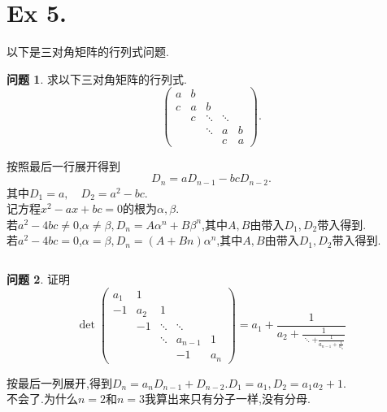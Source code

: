 \documentclass[11pt]{ctexart}
\theoremstyle{definition}
\newtheorem{qqq}{问题}[section]
\numberwithin{equation}{section}
\begin{document}
\section{Ex 5.}
以下是三对角矩阵的行列式问题.
\begin{qqq}
    求以下三对角矩阵的行列式.
    \begin{equation}
        \begin{pmatrix}
            a&b& & & \\c&a&b& & \\ & c&\ddots&\ddots& \\ & & \ddots &a & b\\ &&&c&a
        \end{pmatrix}.
    \end{equation}
\end{qqq}
\begin{aaa}
    按照最后一行展开得到\[D_{n}=aD_{n-1}-bcD_{n-2}.\]
    其中$D_1=a,\quad D_2=a^2-bc.$\\
    记方程$x^2-ax+bc=0$的根为$\alpha,\beta.$\\
    若$a^2-4bc\neq 0$,$\alpha\neq \beta$$,D_n=A\alpha^n+B\beta^n$,其中$A,B$由带入$D_1,D_2$带入得到.\\
    若$a^2-4bc= 0$,$\alpha= \beta$$,D_n=(A+Bn)\alpha^n$,其中$A,B$由带入$D_1,D_2$带入得到.
\end{aaa}
\[{}\]
\begin{qqq}
    证明
    \begin{equation}
        \det\begin{pmatrix}
            a_1&1\\-1&a_2&1\\ &-1&\ddots&\ddots&\\ &&\ddots&a_{n-1}&1\\&&&-1&a_n
        \end{pmatrix}=
        a_1+\frac{1}{a_2+\frac{1}{\ddots{+\frac{1}{a_{n-1}+\frac{1}{a_n}}}}}
    \end{equation}
\end{qqq}
\begin{aaa}
    按最后一列展开,得到$D_n=a_nD_{n-1}+D_{n-2}$.\quad $D_1=a_1,D_2=a_1a_2+1.$\\
    不会了.为什么$n=2$和$n=3$我算出来只有分子一样,没有分母.
\end{aaa}
\end{document}
